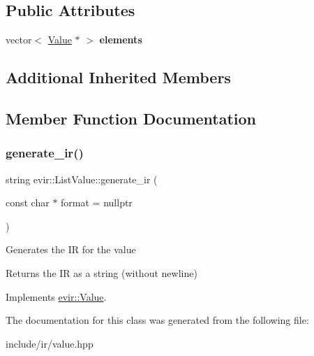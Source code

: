 \subsection*{Public Attributes}
\begin{DoxyCompactItemize}
\item 
\mbox{\label{classevir_1_1ListValue_a4b719e7544de6576a988822950be4b5c}} 
vector$<$ \hyperlink{classevir_1_1Value}{Value} $\ast$ $>$ {\bfseries elements}
\end{DoxyCompactItemize}
\subsection*{Additional Inherited Members}


\subsection{Member Function Documentation}
\mbox{\label{classevir_1_1ListValue_aebd962d9117d8cd22d35bf217975dcff}} 
\subsubsection{\texorpdfstring{generate\+\_\+ir()}{generate\_ir()}}
{\footnotesize\ttfamily string evir\+::\+List\+Value\+::generate\+\_\+ir (\begin{DoxyParamCaption}\item[{const char $\ast$}]{format = {\ttfamily nullptr} }\end{DoxyParamCaption})\hspace{0.3cm}{\ttfamily [virtual]}}

Generates the IR for the value \begin{DoxyReturn}{Returns}
the IR as a string (without newline) 
\end{DoxyReturn}


Implements \hyperlink{classevir_1_1Value_a3e7e5bc634fd5bba528324076fe2a763}{evir\+::\+Value}.



The documentation for this class was generated from the following file\+:\begin{DoxyCompactItemize}
\item 
include/ir/value.\+hpp\end{DoxyCompactItemize}
